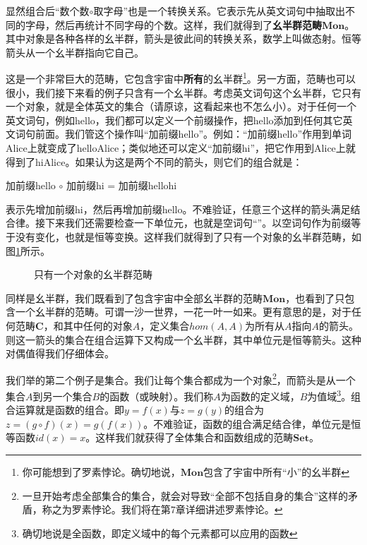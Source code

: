 \documentclass{article}
\begin{document}
显然组合后“数个数$\circ$取字母”也是一个转换关系。它表示先从英文词句中抽取出不同的字母，然后再统计不同字母的个数。这样，我们就得到了\textbf{幺半群范畴}$\pmb{Mon}$。其中对象是各种各样的幺半群，箭头是彼此间的转换关系，数学上叫做态射。恒等箭头从一个幺半群指向它自己。

这是一个非常巨大的范畴，它包含宇宙中\textbf{所有}的幺半群\footnote{你可能想到了罗素悖论。确切地说，$\pmb{Mon}$包含了宇宙中所有“小”的幺半群}。另一方面，范畴也可以很小，我们接下来看的例子只含有一个幺半群。考虑英文词句这个幺半群，它只有一个对象，就是全体英文的集合（请原谅，这看起来也不怎么小）。对于任何一个英文词句，例如hello，我们都可以定义一个前缀操作，把hello添加到任何其它英文词句前面。我们管这个操作叫“加前缀hello”。例如：“加前缀hello”作用到单词Alice上就变成了helloAlice；类似地还可以定义“加前缀hi”，把它作用到Alice上就得到了hiAlice。如果认为这是两个不同的箭头，则它们的组合就是：

\begin{center}
加前缀hello $\circ$ 加前缀hi = 加前缀hellohi
\end{center}

表示先增加前缀hi，然后再增加前缀hello。不难验证，任意三个这样的箭头满足结合律。接下来我们还需要检查一下单位元，也就是空词句“”。以空词句作为前缀等于没有变化，也就是恒等变换。这样我们就得到了只有一个对象的幺半群范畴，如图\ref{fig:monoid-as-category}所示。

\begin{figure}[htbp]
\centering
{}
\caption{只有一个对象的幺半群范畴}
\label{fig:monoid-as-category}
\end{figure}

同样是幺半群，我们既看到了包含宇宙中全部幺半群的范畴$\pmb{Mon}$，也看到了只包含一个幺半群的范畴。可谓一沙一世界，一花一叶一如来。更有意思的是，对于任何范畴$\pmb{C}$，和其中任何的对象$A$，定义集合$hom(A, A)$为所有从$A$指向$A$的箭头。则这一箭头的集合在组合运算下又构成一个幺半群，其中单位元是恒等箭头。这种对偶值得我们仔细体会。

我们举的第二个例子是集合。我们让每个集合都成为一个对象\footnote{一旦开始考虑全部集合的集合，就会对导致“全部不包括自身的集合”这样的矛盾，称之为罗素悖论。我们将在第7章详细讲述罗素悖论。}，而箭头是从一个集合$A$到另一个集合$B$的函数（或映射）。我们称$A$为函数的定义域，$B$为值域\footnote{确切地说是全函数，即定义域中的每个元素都可以应用的函数}。组合运算就是函数的组合。即$y = f(x)$与$z = g(y)$的组合为$z = (g \circ f)(x) = g(f(x))$。不难验证，函数的组合满足结合律，单位元是恒等函数$id(x) = x$。这样我们就获得了全体集合和函数组成的范畴$\pmb{Set}$。
\end{document}

